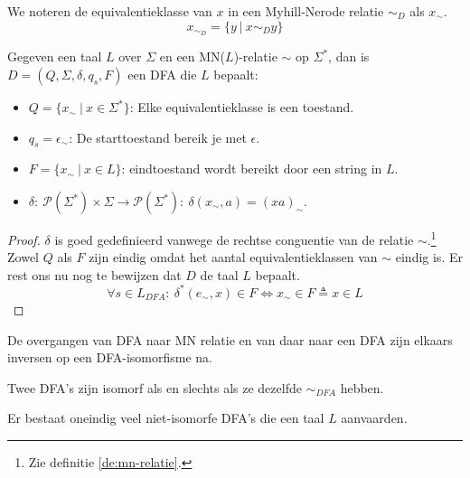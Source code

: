 \documentclass[main.tex]{subfiles}
\begin{document}
\begin{de}
  We noteren de equivalentieklasse van $x$ in een Myhill-Nerode relatie $\sim_{D}$ als $x_{\sim}$.
  \[ x_{\sim_{D}} = \{ y\ |\ x \sim_{D} y \} \]
\end{de}

\begin{st}
  Gegeven een taal $L$ over $\Sigma$ en een MN($L$)-relatie $\sim$ op $\Sigma^{*}$, dan is $D = (Q,\Sigma,\delta,q_{s},F)$ een DFA die $L$ bepaalt:
  \begin{itemize}
  \item $Q = \{ x_{\sim}\ |\ x \in \Sigma^{*} \}$: Elke equivalentieklasse is een toestand.
  \item $q_{s} = \epsilon_{\sim}$: De starttoestand bereik je met $\epsilon$.
  \item $F = \{ x_{\sim}\ |\ x\in L \}$: eindtoestand wordt bereikt door een string in $L$.
  \item $\delta:\ \mathcal{P}(\Sigma^{*})\times\Sigma \rightarrow \mathcal{P}(\Sigma^{*}):\ \delta(x_{\sim},a) = (xa)_{\sim}$.
  \end{itemize}
  \begin{proof}
    $\delta$ is goed gedefinieerd vanwege de rechtse conguentie van de relatie $\sim$.\footnote{Zie definitie \ref{de:mn-relatie}.}
    Zowel $Q$ als $F$ zijn eindig omdat het aantal equivalentieklassen van $\sim$ eindig is.
    Er rest ons nu nog te bewijzen dat $D$ de taal $L$ bepaalt.
    \[ \forall s\in L_{DFA}:\ \delta^{*}(e_{\sim},x) \in F \Leftrightarrow x_{\sim} \in F \triangleq x \in L \]
  \end{proof}
\end{st}

\begin{st}
  De overgangen van DFA naar MN relatie en van daar naar een DFA zijn elkaars inversen op een DFA-isomorfisme na.
\end{st}

\begin{st}
  Twee DFA's zijn isomorf als en slechts als ze dezelfde $\sim_{DFA}$ hebben.
\end{st}

\begin{st}
  Er bestaat oneindig veel niet-isomorfe DFA's die een taal $L$ aanvaarden.

\end{st}
\end{document}
